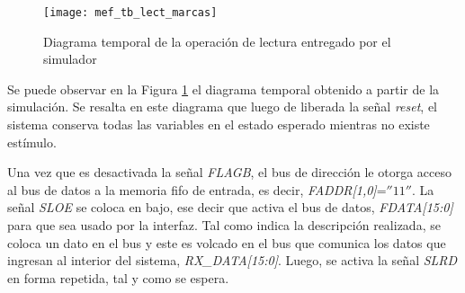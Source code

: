 %
%	
%
%
%
%
%		
%
%
%
%
%		

\begin{figure}[b]
	\centering
	\texttt{[image: mef\_tb\_lect\_marcas]}
	\caption{Diagrama temporal de la operación de lectura entregado por el simulador}
	\label{tb:lect}
\end{figure}

Se puede observar en la Figura \ref{tb:lect} el diagrama temporal obtenido a partir de la simulación. Se resalta en este diagrama que luego de liberada la señal \textit{reset}, el sistema conserva todas las variables en el estado esperado mientras no existe estímulo.

Una vez que es desactivada la señal {\it FLAGB}, el bus de dirección le otorga acceso al bus de datos a la memoria \acrshort{fifo} de entrada, es decir, {\it FADDR[1,0]}=$''11''$. La señal {\it SLOE} se coloca en bajo, ese decir que activa el bus de datos, {\it FDATA[15:0]} para que sea usado por la interfaz. Tal como indica la descripción realizada, se coloca un dato en el bus y este es volcado en el bus que comunica los datos que ingresan al interior del sistema, {\it RX\_DATA[15:0]}. Luego, se activa la señal {\it SLRD} en forma repetida, tal y como se espera.

